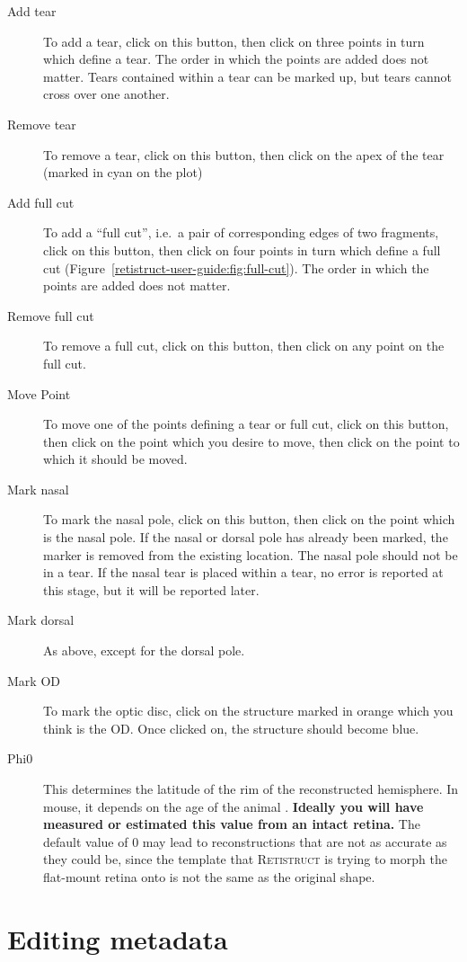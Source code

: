 \documentclass{book}
\begin{document}
\begin{description}
\item[Add tear] To add a tear, click on this button, then click on
  three points in turn which define a tear. The order in which the
  points are added does not matter. Tears contained within a tear can
  be marked up, but tears cannot cross over one another.
\item[Remove tear] To remove a tear, click on this button, then click
  on the apex of the tear (marked in cyan on the plot)
\item[Add full cut] To add a ``full cut'', i.e.~a pair of
  corresponding edges of two fragments, click on this button, then
  click on four points in turn which define a full cut
  (Figure~\ref{retistruct-user-guide:fig:full-cut}). The order
  in which the points are added does not matter.
\item[Remove full cut] To remove a full cut, click on this
  button, then click on any point on the full cut.
\item[Move Point] To move one of the points defining a tear or
  full cut, click on this button, then click on the point which
  you desire to move, then click on the point to which it should be
  moved.
\item[Mark nasal] To mark the nasal pole, click on this button, then
  click on the point which is the nasal pole.  If the nasal or
  dorsal pole has already been marked, the marker is removed from
  the existing location. The nasal pole should not be in a tear. If
  the nasal tear is placed within a tear, no error is reported at this
  stage, but it will be reported later.
\item[Mark dorsal] As above, except for the dorsal pole.
\item[Mark OD] To mark the optic disc, click on the structure marked
  in orange which you think is the OD. Once clicked on, the structure
  should become blue.
\item[Phi0] This determines the latitude of the rim of the
  reconstructed hemisphere. In mouse, it depends on the age of the
  animal \cite{SterrattEtal2012}.
  \textbf{Ideally you will have measured or estimated this value from
    an intact retina.}
  The default value of 0 may lead to reconstructions that are not as
  accurate as they could be, since the template that
  \textsc{Retistruct} is trying to morph the flat-mount retina onto is
  not the same as the original shape.
\end{description}

\section{Editing metadata}
\label{retistruct-manual:sec:metadata}
\end{document}
